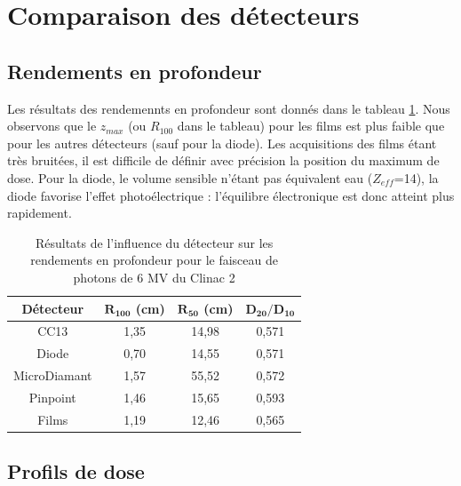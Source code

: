 \documentclass{book}
\begin{document}
  

\section{Comparaison des détecteurs}
\subsection{Rendements en profondeur}

Les résultats des rendemennts en profondeur sont donnés dans le tableau \ref*{table_rdt_detecteurs_ponctuels}. Nous observons que le $z_{max}$ (ou $R_{100}$ dans le tableau) pour les films est plus faible que pour les autres détecteurs (sauf pour la diode). Les acquisitions des films étant très bruitées, il est difficile de définir avec précision la position du maximum de dose. Pour la diode, le volume sensible n'étant pas équivalent eau ($Z_{eff}$=14), la diode favorise l'effet photoélectrique : l'équilibre électronique est donc atteint plus rapidement.

\begin{table}[h]
  \centering
  \begin{tabular}{cccc}
    \toprule
    \textbf{Détecteur} & $\mathbf{R_{100}}$ \textbf{(cm)} & $\mathbf{R_{50}}$ \textbf{(cm)} & $\mathbf{D_{20}/D_{10}}$ \\
    \toprule
    CC13 & 1,35 & 14,98 & 0,571 \\
    Diode & 0,70 & 14,55 & 0,571 \\
    MicroDiamant & 1,57 & 55,52 & 0,572 \\
    Pinpoint & 1,46 & 15,65 & 0,593 \\
    Films & 1,19 & 12,46 & 0,565 \\
    \bottomrule
  \end{tabular}
  \caption{Résultats de l'influence du détecteur sur les rendements en profondeur pour le faisceau de photons de 6 MV du Clinac 2}
  \label{table_rdt_detecteurs_ponctuels}
\end{table}

\subsection{Profils de dose}
\end{document}
